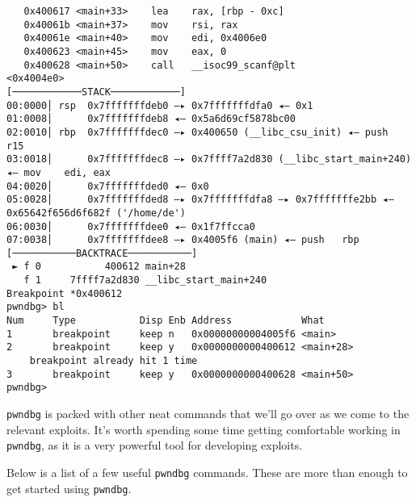 \documentclass{article}
\begin{document}
\begin{lstlisting}
   0x400617 <main+33>    lea    rax, [rbp - 0xc]
   0x40061b <main+37>    mov    rsi, rax
   0x40061e <main+40>    mov    edi, 0x4006e0
   0x400623 <main+45>    mov    eax, 0
   0x400628 <main+50>    call   __isoc99_scanf@plt            <0x4004e0>
[────────────STACK────────────]
00:0000│ rsp  0x7fffffffdeb0 —▸ 0x7fffffffdfa0 ◂— 0x1
01:0008│      0x7fffffffdeb8 ◂— 0x5a6d69cf5878bc00
02:0010│ rbp  0x7fffffffdec0 —▸ 0x400650 (__libc_csu_init) ◂— push   r15
03:0018│      0x7fffffffdec8 —▸ 0x7ffff7a2d830 (__libc_start_main+240) ◂— mov    edi, eax
04:0020│      0x7fffffffded0 ◂— 0x0
05:0028│      0x7fffffffded8 —▸ 0x7fffffffdfa8 —▸ 0x7fffffffe2bb ◂— 0x65642f656d6f682f ('/home/de')
06:0030│      0x7fffffffdee0 ◂— 0x1f7ffcca0
07:0038│      0x7fffffffdee8 —▸ 0x4005f6 (main) ◂— push   rbp
[───────────BACKTRACE───────────]
 ► f 0           400612 main+28
   f 1     7ffff7a2d830 __libc_start_main+240
Breakpoint *0x400612
pwndbg> bl
Num     Type           Disp Enb Address            What
1       breakpoint     keep n   0x00000000004005f6 <main>
2       breakpoint     keep y   0x0000000000400612 <main+28>
	breakpoint already hit 1 time
3       breakpoint     keep y   0x0000000000400628 <main+50>
pwndbg> 
\end{lstlisting}

\texttt{pwndbg} is packed with other neat commands that we'll go over as we come
to the relevant exploits. It's worth spending some time getting comfortable
working in \texttt{pwndbg}, as it is a very powerful tool for developing
exploits.

Below is a list of a few useful \texttt{pwndbg} commands. These are more than
enough to get started using \texttt{pwndbg}.
\end{document}
